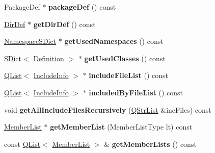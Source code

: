 \begin{DoxyCompactItemize}
Package\+Def $\ast$ {\bfseries package\+Def} () const
\item 
\mbox{\label{class_file_def_a34e232f3ab6e367b3cb2b2a2f25dc179}} 
\mbox{\hyperlink{class_dir_def}{Dir\+Def}} $\ast$ {\bfseries get\+Dir\+Def} () const
\item 
\mbox{\label{class_file_def_aaaf9fbbd5028cacb5624788168fd6c27}} 
\mbox{\hyperlink{class_namespace_s_dict}{Namespace\+S\+Dict}} $\ast$ {\bfseries get\+Used\+Namespaces} () const
\item 
\mbox{\label{class_file_def_a43c308d44dce351676ef57d597fcc3b8}} 
\mbox{\hyperlink{class_s_dict}{S\+Dict}}$<$ \mbox{\hyperlink{class_definition}{Definition}} $>$ $\ast$ {\bfseries get\+Used\+Classes} () const
\item 
\mbox{\label{class_file_def_a4e9e0f617f41b801b40532543b7ffd38}} 
\mbox{\hyperlink{class_q_list}{Q\+List}}$<$ \mbox{\hyperlink{struct_include_info}{Include\+Info}} $>$ $\ast$ {\bfseries include\+File\+List} () const
\item 
\mbox{\label{class_file_def_aca521ba9b5f65d9271cf6ceecfb489f7}} 
\mbox{\hyperlink{class_q_list}{Q\+List}}$<$ \mbox{\hyperlink{struct_include_info}{Include\+Info}} $>$ $\ast$ {\bfseries included\+By\+File\+List} () const
\item 
\mbox{\label{class_file_def_a7eb7ebf5ee639bdf13407da2afb056b2}} 
void {\bfseries get\+All\+Include\+Files\+Recursively} (\mbox{\hyperlink{class_q_str_list}{Q\+Str\+List}} \&inc\+Files) const
\item 
\mbox{\label{class_file_def_aea54107e152d2089053fb7929e8cbb1e}} 
\mbox{\hyperlink{class_member_list}{Member\+List}} $\ast$ {\bfseries get\+Member\+List} (Member\+List\+Type lt) const
\item 
\mbox{\label{class_file_def_aded7fa9a2d511e843008cdded553b315}} 
const \mbox{\hyperlink{class_q_list}{Q\+List}}$<$ \mbox{\hyperlink{class_member_list}{Member\+List}} $>$ \& {\bfseries get\+Member\+Lists} () const
\item 
\mbox{\label{class_file_def_a6e5dddac455084d1085aa487c9b3fc0a}} 

\end{DoxyCompactItemize}
